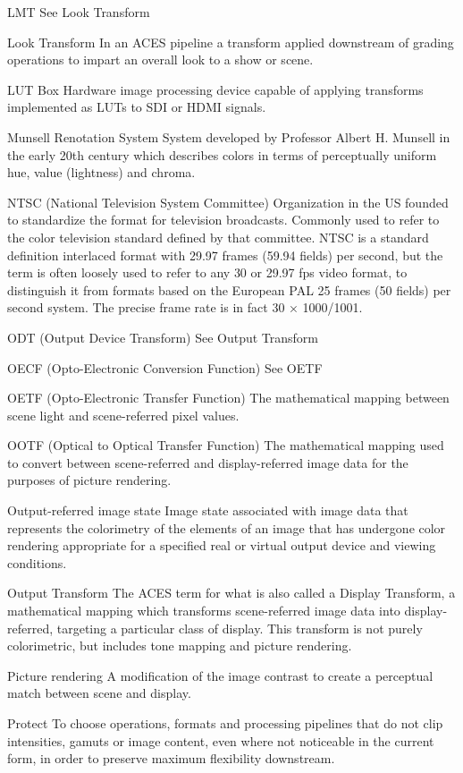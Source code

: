 LMT
See Look Transform

Look Transform
In an ACES pipeline a transform applied downstream of grading operations to impart an overall look to a show or scene.

LUT Box
Hardware image processing device capable of applying transforms implemented as LUTs to SDI or HDMI signals.

Munsell Renotation System
System developed by Professor Albert H. Munsell in the early 20th century which describes colors in terms of perceptually uniform hue, value (lightness) and chroma.

NTSC (National Television System Committee)
Organization in the US founded to standardize the format for television broadcasts. Commonly used to refer to the color television standard defined by that committee. NTSC is a standard definition interlaced format with 29.97 frames (59.94 fields) per second, but the term is often loosely used to refer to any 30 or 29.97 fps video format, to distinguish it from formats based on the European PAL 25 frames (50 fields) per second system. The precise frame rate is in fact 30 × 1000/1001.

ODT (Output Device Transform)
See Output Transform

OECF (Opto-Electronic Conversion Function)
See OETF

OETF (Opto-Electronic Transfer Function)
The mathematical mapping between scene light and scene-referred pixel values.

OOTF (Optical to Optical Transfer Function)
The mathematical mapping used to convert between scene-referred and display-referred image data for the purposes of picture rendering.

Output-referred image state
Image state associated with image data that represents the colorimetry of the elements of an image that has undergone color rendering appropriate for a specified real or virtual output device and viewing conditions.

Output Transform
The ACES term for what is also called a Display Transform, a mathematical mapping which transforms scene-referred image data into display-referred, targeting a particular class of display. This transform is not purely colorimetric, but includes tone mapping and picture rendering.

Picture rendering
A modification of the image contrast to create a perceptual match between scene and display.

Protect
To choose operations, formats and processing pipelines that do not clip intensities, gamuts or image content, even where not noticeable in the current form, in order to preserve maximum flexibility downstream.

